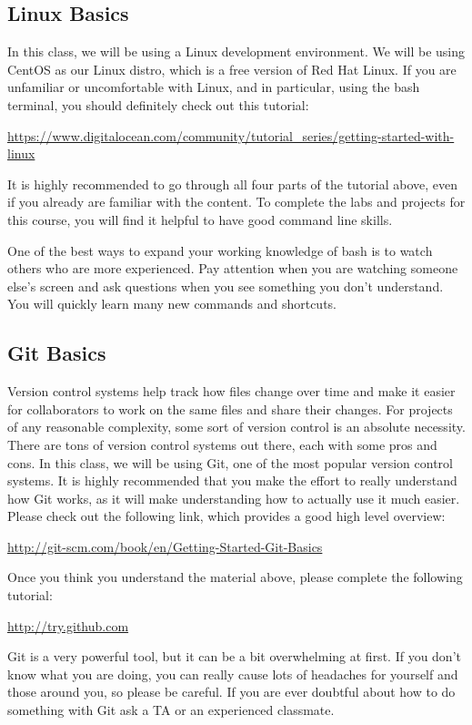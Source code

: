 \documentclass[11pt]{article}
\begin{document}
\subsection{Linux Basics}
In this class, we will be using a Linux development environment. We will be using CentOS as our Linux distro, which is a free version of Red Hat Linux. If you are unfamiliar or uncomfortable with Linux, and in particular, using the bash terminal, you should definitely check out this tutorial:

\url{https://www.digitalocean.com/community/tutorial_series/getting-started-with-linux}

It is highly recommended to go through all four parts of the tutorial above, even if you already are familiar with the content. To complete the labs and projects for this course, you will find it helpful to have good command line skills.

One of the best ways to expand your working knowledge of bash is to watch others who are more experienced. Pay attention when you are watching someone else's screen and ask questions when you see something you don't understand. You will quickly learn many new commands and shortcuts.

\subsection{Git Basics}
Version control systems help track how files change over time and make it easier for collaborators to work on the same files and share their changes. For projects of any reasonable complexity, some sort of version control is an absolute necessity. There are tons of version control systems out there, each with some pros and cons. In this class, we will be using Git, one of the most popular version control systems. It is highly recommended that you make the effort to really understand how Git works, as it will make understanding how to actually use it much easier. Please check out the following link, which provides a good high level overview:

\url{http://git-scm.com/book/en/Getting-Started-Git-Basics}

Once you think you understand the material above, please complete the following tutorial:

\url{http://try.github.com}

Git is a very powerful tool, but it can be a bit overwhelming at first. If you don't know what you are doing, you can really cause lots of headaches for yourself and those around you, so please be careful. If you are ever doubtful about how to do something with Git ask a TA or an experienced classmate.
\end{document}
